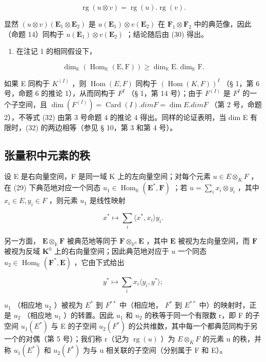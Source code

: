 \[
\operatorname{rg} (u \otimes v) = \operatorname{rg} (u). \operatorname{rg} (v).\tag{31}
\]

显然 \((u\otimes v)(\mathbf{E}_1\otimes \mathbf{E}_2)\) 是 \(u(\mathbf{E}_1)\otimes v(\mathbf{E}_2)\) 在 \(\mathbf{F}_1\otimes \mathbf{F}_2\) 中的典范像，因此（命题 14）同构于 \(u(\mathbf{E}_1)\otimes v(\mathbf{E}_2)\) ；结论随后由 (30) 得出。

\begin{enumerate}
\def\labelenumi{(\arabic{enumi})}
\setcounter{enumi}{2}
\tightlist
\item
  在注记 1 的相同假设下，
\end{enumerate}

\[
\dim_ {\mathbb {K}} (\operatorname{Hom} _ {\mathbb {K}} (\mathrm{E}, \mathrm{F})) \geqslant \dim_ {\mathbb {K}} \mathrm{E}. \dim_ {\mathbb {K}} \mathrm{F}.\tag{32}
\]

如果 E 同构于 \(K^{(I)}\) ，则 \(\operatorname{Hom}(E, F)\) 同构于 \((\operatorname{Hom}(K, F))^{I}\) （§ 1，第 6 号，命题 6 的推论 1），从而同构于 \(F^{I}\) （§ 1，第 14 号）；由于 \(F^{(I)}\) 是 \(F^{I}\) 的一个子空间，且 \(\dim(F^{(I)}) = \operatorname{Card}(I).dim F = \dim E. dim F\) （第 2 号，命题 2），不等式 (32) 由第 3 号命题 4 的推论 4 得出。同样的论证表明，当 dim E 有限时，(32) 的两边相等（参见 § 10，第 3 和第 4 号）。

\subsection{张量积中元素的秩}

设 E 是右向量空间，F 是同一域 K 上的左向量空间；对每个元素 \(u \in E \otimes_{K} F\) ，在 (29) 下典范地对应一个同态 \(u_{1} \in \operatorname{Hom}_{\mathbb{K}}(\mathbf{E}^{*}, \mathbf{F})\) ；若 \(u = \sum_{i} x_{i} \otimes y_{i}\) ，其中 \(x_{i} \in E, y_{i} \in F\) ，则元素 \(u_{1}\) 是线性映射

\[
x ^ {*} \mapsto \sum_ {i} \langle x ^ {*}, x _ {i} \rangle y _ {i}.\tag{33}
\]

另一方面， \(\mathbf{E} \otimes_{\mathbb{K}} \mathbf{F}\) 被典范地等同于 \(\mathbf{F} \otimes_{\mathbb{K}^0} \mathbf{E}\) ，其中 \(\mathbf{E}\) 被视为左向量空间，而 \(\mathbf{F}\) 被视为反域 \(\mathbf{K}^0\) 上的右向量空间；因此典范地对应于 \(u\) 一个同态 \(u_2 \in \operatorname{Hom}_{\mathbb{K}}(\mathbf{F}^*, \mathbf{E})\) ，它由下式给出

\[
y ^ {*} \mapsto \sum_ {i} x _ {i} \langle y _ {i}, y ^ {*} \rangle ;\tag{34}
\]

\(u_{1}\) （相应地 \(u_{2}\) ）被视为 \(E^{*}\) 到 \(F^{**}\) 中（相应地， \(F^{*}\) 到 \(E^{**}\) 中）的映射时，正是 \(u_{2}\) （相应地 \(u_{1}\) ）的转置。因此 \(u_{1}\) 和 \(u_{2}\) 的秩等于同一个有限数 r，即 F 的子空间 \(u_{1}(E^{*})\) 与 E 的子空间 \(u_{2}(F^{*})\) 的公共维数，其中每一个都典范同构于另一个的对偶（第 5 号）；我们称 r（记为 \(\operatorname{rg}(u)\) ）为 \(E \otimes_{K} F\) 的元素 u 的秩，并称 \(u_{1}(E^{*})\) 和 \(u_{2}(F^{*})\) 为与 u 相关联的子空间（分别属于 F 和 E）。

